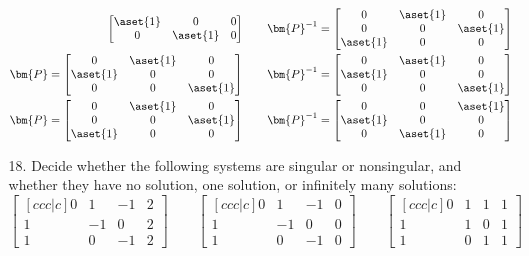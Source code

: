\begin{itemize}
\begin{itemize}
{\begin{align*}
\begin{bmatrix}
            \aset{1} & 0 & 0 \\
            0 & \aset{1} & 0
          \end{bmatrix} \qquad
          \bm{P}^{-1} =
          \begin{bmatrix}
            0 & \aset{1} & 0 \\
            0 & 0 & \aset{1} \\
            \aset{1} & 0 & 0
          \end{bmatrix} \\
          \bm{P} =
          \begin{bmatrix}
            0 & \aset{1} & 0  \\
            \aset{1} & 0 & 0 \\
            0 & 0 & \aset{1}
          \end{bmatrix} \qquad
          \bm{P}^{-1} =
          \begin{bmatrix}
            0 & \aset{1} & 0  \\
            \aset{1} & 0 & 0 \\
            0 & 0 & \aset{1}
          \end{bmatrix} \\
          \bm{P} =
          \begin{bmatrix}
            0 & \aset{1} & 0 \\
            0 & 0 & \aset{1} \\
            \aset{1} & 0 & 0
          \end{bmatrix} \qquad
          \bm{P}^{-1} =
          \begin{bmatrix}
            0 & 0 & \aset{1} \\
            \aset{1} & 0 & 0 \\
            0 & \aset{1} & 0
          \end{bmatrix}
        \end{align*}}

      \item[18.] Decide whether the following systems are singular or
        nonsingular, and whether they have no solution, one solution, or
        infinitely many solutions:
        \[%
        \begin{bmatrix}[ccc|c]
          0 & 1 & -1 & 2 \\
          1 & -1 & 0 & 2 \\
          1 & 0 & -1 & 2
        \end{bmatrix} \qquad
        \begin{bmatrix}[ccc|c]
          0 & 1 & -1 & 0 \\
          1 & -1 & 0 & 0 \\
          1 & 0 & -1 & 0
        \end{bmatrix} \qquad
        \begin{bmatrix}[ccc|c]
          0 & 1 & 1 & 1 \\
          1 & 1 & 0 & 1 \\
          1 & 0 & 1 & 1
        \end{bmatrix}
        \]%


\end{itemize}
\end{itemize}
